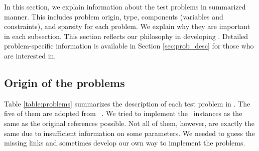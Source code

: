 In this section, we explain information about the test problems in summarized manner. This includes problem origin, type, components (variables and constraints), and sparsity for each problem. We explain why they are important in each subsection. This section reflects our philosophy in developing \siplibtwo. Detailed problem-specific information is available in Section \ref{sec:prob_desc} for those who are interested in.

\subsection{Origin of the problems}
Table \ref{table:problems} summarizes the description of each test problem in \siplibtwo. The five of them are adopted from \siplib\ \cite{web:SIPLIB1}. We tried to implement the \siplib\ instances as the same as the original references possible. Not all of them, however, are exactly the same due to insufficient information on some parameters. We needed to guess the missing links and sometimes develop our own way to implement the problems. 
